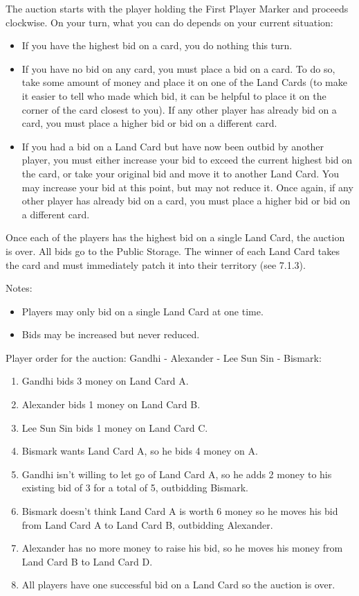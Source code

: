 \documentclass[10pt,twocolumn]{article}
\begin{document}
The auction starts with the player holding the First Player Marker and proceeds clockwise. On your turn, what you can do depends on your current situation:
\begin{itemize}
\item If you have the highest bid on a card, you do nothing this turn.
\item If you have no bid on any card, you must place a bid on a card. To do so, take some amount of money and place it on one of the Land Cards (to make it easier to tell who made which bid, it can be helpful to place it on the corner of the card closest to you). If any other player has already bid on a card, you must place a higher bid or bid on a different card.
\item If you had a bid on a Land Card but have now been outbid by another player, you must either increase your bid to exceed the current highest bid on the card, or take your original bid and move it to another Land Card. You may increase your bid at this point, but may not reduce it. Once again, if any other player has already bid on a card, you must place a higher bid or bid on a different card.
\end{itemize}
Once each of the players has the highest bid on a single Land Card, the auction is over. All bids go to the Public Storage. The winner of each Land Card takes the card and must immediately patch it into their territory (see 7.1.3).

Notes:
\begin{itemize}
\item Players may only bid on a single Land Card at one time.
\item Bids may be increased but never reduced.
\end{itemize}
\begin{BoxExample}Player order for the auction: Gandhi - Alexander - Lee Sun Sin - Bismark:
\begin{enumerate}
\item Gandhi bids 3 money on Land Card A.
\item Alexander bids 1 money on Land Card B.
\item Lee Sun Sin bids 1 money on Land Card C.
\item Bismark wants Land Card A, so he bids 4 money on A.
\item Gandhi isn't willing to let go of Land Card A, so he adds 2 money to his existing bid of 3 for a total of 5, outbidding Bismark.
\item Bismark doesn't think Land Card A is worth 6 money so he moves his bid from Land Card A to Land Card B, outbidding Alexander.
\item Alexander has no more money to raise his bid, so he moves his money from Land Card B to Land Card D.
\item All players have one successful bid on a Land Card so the auction is over.
\end{enumerate}
\end{BoxExample}
\end{document}
